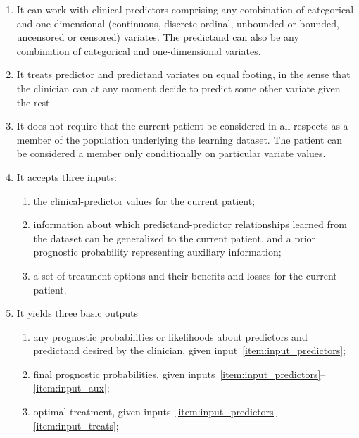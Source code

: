 \documentclass[utf8]{FrontiersinHarvard} %
\renewcommand*{\|}[1][]{\nonscript\:#1\vert\nonscript\:\mathopen{}}
\begin{document}
\begin{enumerate}
\item\label{item:feat_variates} It can work with clinical predictors comprising any combination of categorical and one-dimensional (continuous, discrete ordinal, unbounded or bounded, uncensored or censored) variates. The predictand can also be any combination of categorical and one-dimensional variates.

\item\label{item:feat_indifferentvariates} It treats predictor and predictand variates on equal footing, in the sense that the clinician can at any moment decide to predict some other variate given the rest.

\item\label{item:feat_conditionalstats} It does not require that the current patient be considered in all respects as a member of the population underlying the learning dataset. The patient can be considered a member only conditionally on particular variate values.
  
\item\label{item:feat_inputs} It accepts three inputs:
  \begin{enumerate}
  \item\label{item:input_predictors} the clinical-predictor values for the current patient;
  \item\label{item:input_aux} information about which predictand-predictor relationships learned from the dataset can be generalized to the current patient, and a prior prognostic probability representing auxiliary information;
  \item\label{item:input_treats} a set of treatment options and their benefits and losses for the current patient.
  \end{enumerate}

\item\label{item:feat_outputs} It yields three basic outputs
  \begin{enumerate}
  \item\label{item:ouput_predictors} any prognostic probabilities or likelihoods about predictors and predictand desired by the clinician, given input~\ref{item:input_predictors};
  \item\label{item:output_aux} final prognostic probabilities, given inputs~\ref{item:input_predictors}--\ref{item:input_aux};
  \item\label{item:output_treats} optimal treatment, given inputs~\ref{item:input_predictors}--\ref{item:input_treats};
  \end{enumerate}
  

\end{enumerate}
\end{document}
